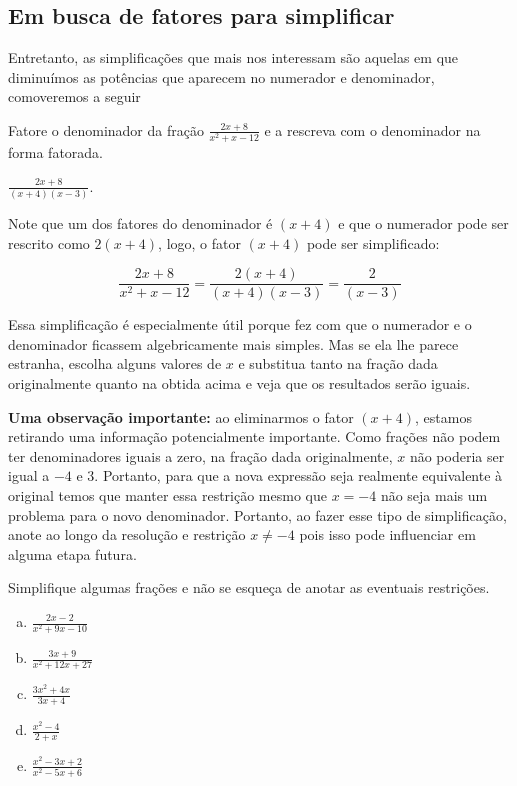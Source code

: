 \documentclass[main_estudante.tex]{subfiles}
\begin{document}
\subsection*{Em busca de fatores para simplificar}

Entretanto, as simplificações que mais nos interessam são aquelas em que diminuímos as potências que aparecem no numerador e denominador, comoveremos a seguir 

\begin{questao}
Fatore o denominador da fração $\frac{2x+8}{x^2+x-12}$ e a rescreva com o denominador na forma fatorada. 
\end{questao}

\begin{gabarito}
	\begin{gabaritoQuestao}
		$\frac{2x+8}{(x+4)(x-3)}$.
	\end{gabaritoQuestao}
\end{gabarito}

Note que um dos fatores do denominador é $(x+4)$ e que o numerador pode ser rescrito como $2(x+4)$, logo, o fator $(x+4)$ pode ser simplificado:

$$\frac{2x+8}{x^2+x-12} = \frac{2(x+4)}{(x+4)(x-3)} = \frac{2}{(x-3)}$$

Essa simplificação é especialmente útil porque fez com que o numerador e o denominador ficassem algebricamente mais simples. Mas se ela lhe parece estranha, escolha alguns valores de $x$ e substitua tanto na fração dada originalmente quanto na obtida acima e veja que os resultados serão iguais.

\textbf{Uma observação importante:} ao eliminarmos o fator $(x+4)$, estamos retirando uma informação potencialmente importante. Como frações não podem ter denominadores iguais a zero, na fração dada originalmente, $x$ não poderia ser igual a $-4$ e $3$. Portanto, para que a nova expressão seja realmente equivalente à original temos que manter essa restrição mesmo que $x=-4$ não seja mais um problema para o novo denominador. Portanto, ao fazer esse tipo de simplificação, anote ao longo da resolução e restrição $x \neq -4$ pois isso pode influenciar em alguma etapa futura.

\begin{questao}
Simplifique algumas frações e não se esqueça de anotar as eventuais restrições.
\begin{enumerate}[a)]
\item $\frac{2x-2}{x^2+9x-10}$
\item $\frac{3x+9}{x^2+12x+27}$
\item $\frac{3x^2+4x}{3x+4}$
\item $\frac{x^2-4}{2+x}$
\item $\frac{x^2-3x+2}{x^2-5x+6}$
\end{enumerate}
\end{questao}
\end{document}
